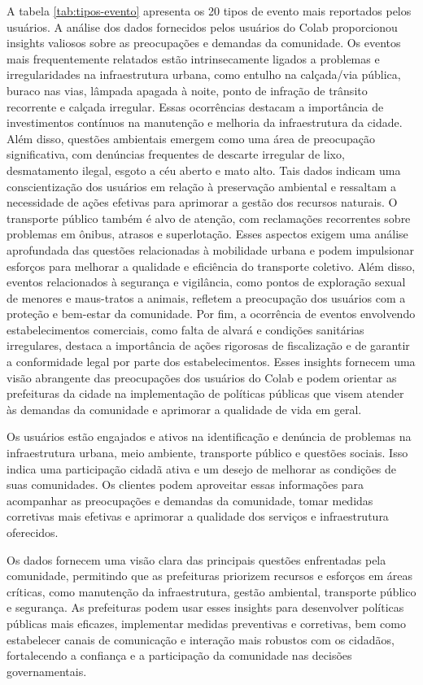 A tabela \autoref{tab:tipos-evento} apresenta os 20 tipos de evento mais reportados pelos usuários. A análise dos dados fornecidos pelos usuários do Colab proporcionou insights valiosos sobre as preocupações e demandas da comunidade. Os eventos mais frequentemente relatados estão intrinsecamente ligados a problemas e irregularidades na infraestrutura urbana, como entulho na calçada/via pública, buraco nas vias, lâmpada apagada à noite, ponto de infração de trânsito recorrente e calçada irregular. Essas ocorrências destacam a importância de investimentos contínuos na manutenção e melhoria da infraestrutura da cidade. Além disso, questões ambientais emergem como uma área de preocupação significativa, com denúncias frequentes de descarte irregular de lixo, desmatamento ilegal, esgoto a céu aberto e mato alto. Tais dados indicam uma conscientização dos usuários em relação à preservação ambiental e ressaltam a necessidade de ações efetivas para aprimorar a gestão dos recursos naturais. O transporte público também é alvo de atenção, com reclamações recorrentes sobre problemas em ônibus, atrasos e superlotação. Esses aspectos exigem uma análise aprofundada das questões relacionadas à mobilidade urbana e podem impulsionar esforços para melhorar a qualidade e eficiência do transporte coletivo. Além disso, eventos relacionados à segurança e vigilância, como pontos de exploração sexual de menores e maus-tratos a animais, refletem a preocupação dos usuários com a proteção e bem-estar da comunidade. Por fim, a ocorrência de eventos envolvendo estabelecimentos comerciais, como falta de alvará e condições sanitárias irregulares, destaca a importância de ações rigorosas de fiscalização e de garantir a conformidade legal por parte dos estabelecimentos. Esses insights fornecem uma visão abrangente das preocupações dos usuários do Colab e podem orientar as prefeituras da cidade na implementação de políticas públicas que visem atender às demandas da comunidade e aprimorar a qualidade de vida em geral.

Os usuários estão engajados e ativos na identificação e denúncia de problemas na infraestrutura urbana, meio ambiente, transporte público e questões sociais. Isso indica uma participação cidadã ativa e um desejo de melhorar as condições de suas comunidades.
Os clientes podem aproveitar essas informações para acompanhar as preocupações e demandas da comunidade, tomar medidas corretivas mais efetivas e aprimorar a qualidade dos serviços e infraestrutura oferecidos.

Os dados fornecem uma visão clara das principais questões enfrentadas pela comunidade, permitindo que as prefeituras priorizem recursos e esforços em áreas críticas, como manutenção da infraestrutura, gestão ambiental, transporte público e segurança. As prefeituras podem usar esses insights para desenvolver políticas públicas mais eficazes, implementar medidas preventivas e corretivas, bem como estabelecer canais de comunicação e interação mais robustos com os cidadãos, fortalecendo a confiança e a participação da comunidade nas decisões governamentais.

